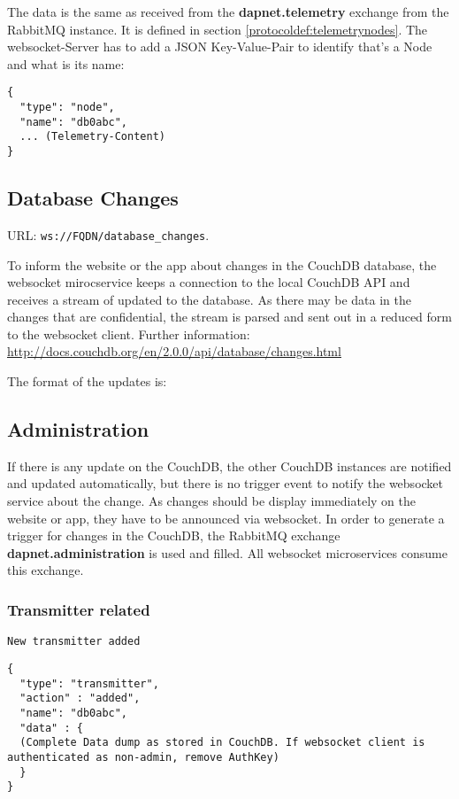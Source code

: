 The data is the same as received from the \textbf{dapnet.telemetry} exchange
from the RabbitMQ instance. It is defined in section
\ref{protocoldef:telemetrynodes}.
The websocket-Server has to add a JSON Key-Value-Pair to identify that's a Node and what is its name:

\begin{lstlisting}
{
  "type": "node",
  "name": "db0abc",
  ... (Telemetry-Content)
}
\end{lstlisting}

\subsection{Database Changes}
\label{protcoldef:websocketapi:databasechanges}
URL: \texttt{ws://FQDN/database\_changes}.

To inform the website or the app about changes in the CouchDB database, the
websocket mirocservice keeps a connection to the local CouchDB API and receives
a stream of updated to the database. As there may be data in the changes that
are confidential, the stream is parsed and sent out in a reduced form to the
websocket client. Further information:
\url{http://docs.couchdb.org/en/2.0.0/api/database/changes.html}

The format of the updates is:



\subsection{Administration}
\label{protocoldef:RabbitMQ:dapnet.administration}
If there is any update on the CouchDB, the other CouchDB instances are notified
and updated automatically, but there is no trigger event to notify the websocket
service about the change. As changes should be display immediately on the
website or app, they have to be announced via websocket. In order to generate a
trigger for changes in the CouchDB, the RabbitMQ exchange
\textbf{dapnet.administration} is used and filled. All websocket microservices
consume this exchange.


\subsubsection{Transmitter related}
\texttt{New transmitter added}

\begin{lstlisting}
{
  "type": "transmitter",
  "action" : "added",
  "name": "db0abc",
  "data" : {
  (Complete Data dump as stored in CouchDB. If websocket client is authenticated as non-admin, remove AuthKey)
  }
}
\end{lstlisting}

